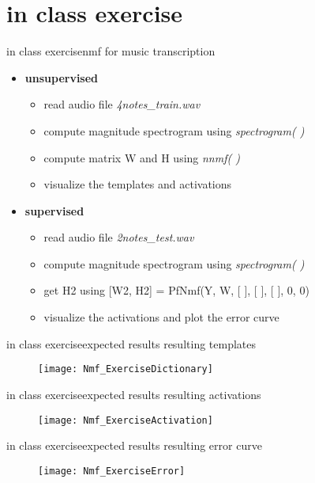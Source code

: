     \section[exercise]{in class exercise}
        \begin{frame}{in class exercise}{nmf for music transcription}
            \begin{itemize}
                \item   \textbf{unsupervised}  
                    \begin{itemize}
                        \item   read audio file \textit{4notes\_train.wav}
                        \item   compute magnitude spectrogram using \textit{spectrogram( )}
                        \item   compute matrix W and H using \textit{nnmf( )}
                        \item   visualize the templates and activations
                    \end{itemize}
                \bigskip
                \item   \textbf{supervised}
                    \begin{itemize}
                        \item   read audio file \textit{2notes\_test.wav}  
                        \item   compute magnitude spectrogram using \textit{spectrogram( )}
                        \item   get H2 using [W2, H2] = PfNmf(Y, W, [ ], [ ], [ ], 0, 0)
                        \item   visualize the activations and plot the error curve
                    \end{itemize}
            \end{itemize}
        \end{frame}
        
        \begin{frame}{in class exercise}{expected results}
        resulting templates 
			\begin{figure}      
         		\texttt{[image: Nmf\_ExerciseDictionary]}
			\end{figure}        
        \end{frame}
        
        \begin{frame}{in class exercise}{expected results}
		resulting activations
			\begin{figure}
				\texttt{[image: Nmf\_ExerciseActivation]}
			\end{figure}
        \end{frame}         
         
        \begin{frame}{in class exercise}{expected results}
		resulting error curve
			\begin{figure}
				\texttt{[image: Nmf\_ExerciseError]}
			\end{figure}
        \end{frame}  



